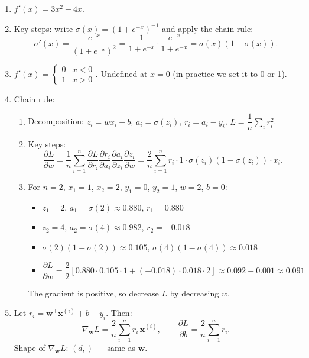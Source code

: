 \documentclass[12pt, a4paper]{scrartcl}
\begin{document}
\begin{enumerate}

\item $f'(x) = 3x^2 - 4x$.

\item Key steps: write $\sigma(x) = (1 + e^{-x})^{-1}$ and apply the chain rule:
\[
\sigma'(x) = \frac{e^{-x}}{(1+e^{-x})^2} = \frac{1}{1+e^{-x}} \cdot \frac{e^{-x}}{1+e^{-x}} = \sigma(x)(1 - \sigma(x)).
\]

\item $f'(x) = \begin{cases} 0 & x < 0 \\ 1 & x > 0 \end{cases}$. Undefined at $x = 0$ (in practice we set it to 0 or 1).

\item Chain rule:
\begin{enumerate}
    \item Decomposition: $z_i = wx_i + b$, \; $a_i = \sigma(z_i)$, \; $r_i = a_i - y_i$, \; $L = \dfrac{1}{n}\displaystyle\sum_i r_i^2$.

    \item Key steps:
    \[
    \frac{\partial L}{\partial w} = \frac{1}{n}\sum_{i=1}^{n} \frac{\partial L}{\partial r_i}\frac{\partial r_i}{\partial a_i}\frac{\partial a_i}{\partial z_i}\frac{\partial z_i}{\partial w} = \frac{2}{n}\sum_{i=1}^{n} r_i \cdot 1 \cdot \sigma(z_i)(1-\sigma(z_i)) \cdot x_i.
    \]

    \item For $n=2$, $x_1=1$, $x_2=2$, $y_1=0$, $y_2=1$, $w=2$, $b=0$:
    \begin{itemize}
        \item $z_1 = 2$, $a_1 = \sigma(2) \approx 0.880$, $r_1 = 0.880$
        \item $z_2 = 4$, $a_2 = \sigma(4) \approx 0.982$, $r_2 = -0.018$
        \item $\sigma(2)(1-\sigma(2)) \approx 0.105$, \quad $\sigma(4)(1-\sigma(4)) \approx 0.018$
        \item $\dfrac{\partial L}{\partial w} = \dfrac{2}{2}\left[0.880 \cdot 0.105 \cdot 1 + (-0.018) \cdot 0.018 \cdot 2\right] \approx 0.092 - 0.001 \approx 0.091$
    \end{itemize}
    The gradient is positive, so decrease $L$ by decreasing $w$.
\end{enumerate}

\item Let $r_i = \mathbf{w}^\top \mathbf{x}^{(i)} + b - y_i$. Then:
\[
\nabla_\mathbf{w} L = \frac{2}{n}\sum_{i=1}^{n} r_i\, \mathbf{x}^{(i)}, \qquad \frac{\partial L}{\partial b} = \frac{2}{n}\sum_{i=1}^{n} r_i.
\]
Shape of $\nabla_\mathbf{w} L$: $(d,)$ --- same as $\mathbf{w}$.


\end{enumerate}
\end{document}

